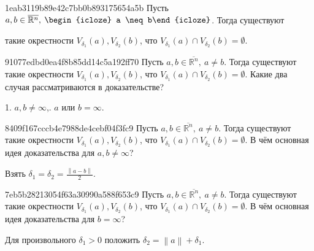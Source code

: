\begin{note}{1eab3119b89e42c7bb0b893175654a5b}
    Пусть \({ a, b \in \overline{\mathbb R^{n}},\: \begin{icloze}{2}a \neq b\end{icloze} }\).
    Тогда существуют \begin{icloze}{1}такие окрестности \({ V_{\delta_1}(a), V_{\delta_2}(b) }\), что \({ V_{\delta_1}(a) \cap V_{\delta_2}(b) = \emptyset }\).\end{icloze}
\end{note}

\begin{note}{91077edbd0ea4f8b85dd14c5a192ff70}
    Пусть \({ a, b \in \overline{\mathbb R^{n}},\: a \neq b }\).
    Тогда существуют такие окрестности \({ V_{\delta_1}(a), V_{\delta_2}(b) }\), что \({ V_{\delta_1}(a) \cap V_{\delta_2}(b) = \emptyset }\).
    Какие два случая рассматриваются в доказательстве?

    \begin{cloze}{1}
        1. \({ a, b \neq \infty }\),. \({ a }\) или \({ b = \infty }\).
    \end{cloze}
\end{note}

\begin{note}{8409f167cccb4e7988de4cebf04f3fc9}
    Пусть \({ a, b \in \overline{\mathbb R^{n}},\: a \neq b }\).
    Тогда существуют такие окрестности \({ V_{\delta_1}(a), V_{\delta_2}(b) }\), что \({ V_{\delta_1}(a) \cap V_{\delta_2}(b) = \emptyset }\).
    В чём основная идея доказательства для \({ a, b \neq \infty }\)?

    \begin{cloze}{1}
        Взять \({ \delta_1 = \delta_2 = \frac{\left\lVert a - b \right\rVert}{2} }\).
    \end{cloze}
\end{note}

\begin{note}{7eb5b28213054f63a30990a588f653c9}
    Пусть \({ a, b \in \overline{\mathbb R^{n}},\: a \neq b }\).
    Тогда существуют такие окрестности \({ V_{\delta_1}(a), V_{\delta_2}(b) }\), что \({ V_{\delta_1}(a) \cap V_{\delta_2}(b) = \emptyset }\).
    В чём основная идея доказательства для \({ b = \infty }\)?

    \begin{cloze}{1}
        Для произвольного \({ \delta_1 > 0 }\) положить \({ \delta_2 = \left\lVert a \right\rVert + \delta_1 }\).
    \end{cloze}
\end{note}

